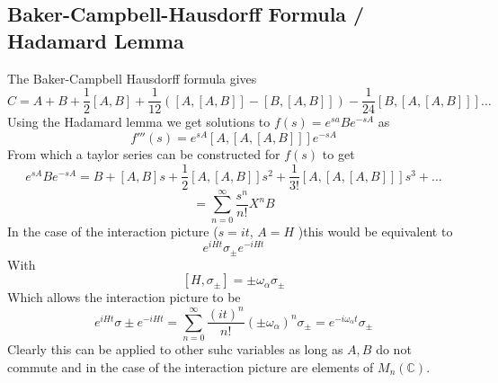 \documentclass[12pt]{article}
\begin{document}
\subsection{ Baker-Campbell-Hausdorff Formula / Hadamard Lemma}
The Baker-Campbell Hausdorff formula gives 
$$ C = A + B + \frac{1}{2}[A,B] + \frac{1}{12}([A, [A, B]] - [B, [A, B]]) - \frac{1}{24}[B, [A, [A,B]]] \ldots $$
Using the Hadamard lemma we get solutions to $f(s) = e^{sa} B e^{-sA}$ as 
$$ f''' (s) = e^{sA} [A,[A,[A,B]]]e^{-sA} $$
From which a taylor series can be constructed for $f(s)$ to get 
$$ e^{sA} B e^{-sA} = B + [A,B]s + \frac{1}{2}[A,[A,B]]s^2 + \frac{1}{3!} [A,[A,[A,B]]] s^3 + \ldots $$
$$ = \sum_{n=0}^{\infty} \frac{s^n}{n!} X^n B $$
In the case of the interaction picture  ($ s = it$, $A = H$ )this would be equivalent to 
$$ e^{i H t} \sigma_{\pm} e^{-i H t} $$
With 
$$ [H, \sigma_{\pm}] = \pm \omega_{\alpha} \sigma_{\pm} $$
Which allows the interaction picture to be 
$$ e^{i H t} \sigma{\pm} e^{-i H t} = \sum_{n=0}^{\infty} \frac{(it)^n}{n!} (\pm \omega_{\alpha})^n \sigma_{\pm} = e^{-i \omega_{\alpha} t} \sigma_{\pm} $$
Clearly this can be applied to other suhc variables as long as $A, B$ do not commute and in the case of the interaction picture are elements of $M_n ( \mathbb{C} ) $. 
\end{document}
